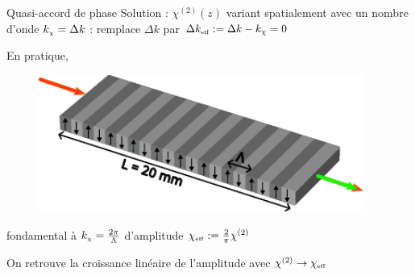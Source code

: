 \documentclass{beamer}
\newcommand{\chie}{\chi_\mathsc{eff}}
\newcommand{\dke}{\Delta k_\mathsc{eff}}
\begin{document}
\begin{frame}{Quasi-accord de phase}
Solution : $\chi^{(2)}(z)$ variant spatialement avec un nombre d'onde $k_{\mathrm{\scriptscriptstyle {\chi}}} = \Delta k$ : remplace $\Delta k$ par $\dke := \Delta k - k_\chi = 0$
\pause

En pratique, %

\begin{figure}
\centering
\includegraphics[height=4.5cm]{./img/PP.pdf}
\end{figure}


\end{frame}


\begin{frame}
\centering
fondamental à $k_{\mathrm{\scriptscriptstyle {\chi}}} = \frac{2\pi}{\Lambda}$ d'amplitude $\chie := \frac2\pi \chi^{(2)}$


\begin{beamerboxesrounded}[width=0.8\textwidth]{}
On retrouve la croissance linéaire de l'amplitude avec $\chi^{(2)} \rightarrow \chie$
\end{beamerboxesrounded}
\end{frame}

\end{document}
